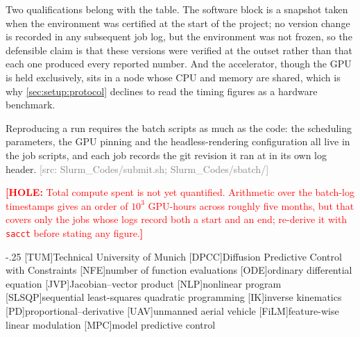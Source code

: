 \documentclass[headsepline,footsepline,footinclude=false,oneside,fontsize=11pt,paper=a4,listof=totoc,bibliography=totoc]{scrbook}
\theoremstyle{definition}
\theoremstyle{plain}
\theoremstyle{remark}
\newif\ifsubmission
\newcommand{\hole}[1]{\ifsubmission\GenericWarning{}{Thesis: a HOLE is left in the submitted build}\fi%
  \textcolor{red}{\textbf{[HOLE:} #1\textbf{]}}}
\newcommand{\srcnote}[1]{\ifsubmission\else\textcolor{gray}{\footnotesize\textsf{[src: #1]}}\fi}
\begin{document}
Two qualifications belong with the table. The software block is a snapshot taken when the
environment was certified at the start of the project; no version change is recorded in any
subsequent job log, but the environment was not frozen, so the defensible claim is that these
versions were verified at the outset rather than that each one produced every reported number.
And the accelerator, though the GPU is held exclusively, sits in a node whose CPU and memory are
shared, which is why \autoref{sec:setup:protocol} declines to read the timing figures as a hardware
benchmark.

Reproducing a run requires the batch scripts as much as the code: the scheduling parameters, the
GPU pinning and the headless-rendering configuration all live in the job scripts, and each job
records the git revision it ran at in its own log header.
\srcnote{Slurm\_Codes/submit.sh; Slurm\_Codes/sbatch/}

\hole{Total compute spent is not yet quantified. Arithmetic over the batch-log timestamps gives an
order of $10^{3}$ GPU-hours across roughly five months, but that covers only the jobs whose logs
record both a start and an end; re-derive it with \texttt{sacct} before stating any figure.}


\begin{acronym}
  \itemsep-.25\baselineskip
  [TUM]{Technical University of Munich}
  [DPCC]{Diffusion Predictive Control with Constraints}
  [NFE]{number of function evaluations}
  [ODE]{ordinary differential equation}
  [JVP]{Jacobian--vector product}
  [NLP]{nonlinear program}
  [SLSQP]{sequential least-squares quadratic programming}
  [IK]{inverse kinematics}
  [PD]{proportional--derivative}
  [UAV]{unmanned aerial vehicle}
  [FiLM]{feature-wise linear modulation}
  [MPC]{model predictive control}
\end{acronym}

\listoffigures{}
\listoftables{}

\printbibliography{}
\end{document}
